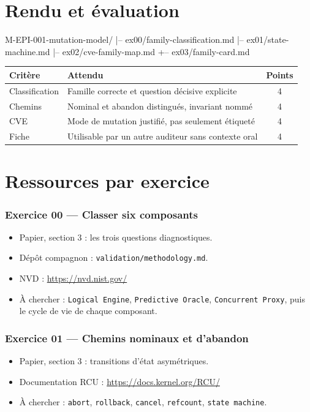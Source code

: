 \documentclass{training}
\begin{document}
\chapter{Rendu et évaluation}

\begin{console}
M-EPI-001-mutation-model/
|-- ex00/family-classification.md
|-- ex01/state-machine.md
|-- ex02/cve-family-map.md
+-- ex03/family-card.md
\end{console}

\begin{center}
\begin{tabularx}{\linewidth}{|l|X|c|}
\hline
\textbf{Critère} & \textbf{Attendu} & \textbf{Points} \\ \hline
Classification & Famille correcte et question décisive explicite & 4 \\ \hline
Chemins & Nominal et abandon distingués, invariant nommé & 4 \\ \hline
CVE & Mode de mutation justifié, pas seulement étiqueté & 4 \\ \hline
Fiche & Utilisable par un autre auditeur sans contexte oral & 4 \\ \hline
\end{tabularx}
\end{center}

\chapter{Ressources par exercice}

\subsection*{Exercice 00 --- Classer six composants}
\begin{itemize}
  \item Papier, section 3 : les trois questions diagnostiques.
  \item Dépôt compagnon : \texttt{validation/methodology.md}.
  \item NVD : \url{https://nvd.nist.gov/}
  \item À chercher : \texttt{Logical Engine}, \texttt{Predictive Oracle},
        \texttt{Concurrent Proxy}, puis le cycle de vie de chaque composant.
\end{itemize}

\subsection*{Exercice 01 --- Chemins nominaux et d'abandon}
\begin{itemize}
  \item Papier, section 3 : transitions d'état asymétriques.
  \item Documentation RCU : \url{https://docs.kernel.org/RCU/}
  \item À chercher : \texttt{abort}, \texttt{rollback}, \texttt{cancel},
        \texttt{refcount}, \texttt{state machine}.
\end{itemize}
\end{document}
